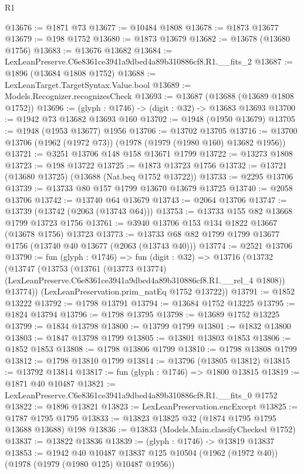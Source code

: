 \begin{lexlean}{R1}
\begin{coremodule}
@13676 := @1871 @73
@13677 := @10484 @1808
@13678 := @1873 @13677
@13679 := @198 @1752
@13680 := @1873 @13679
@13682 := @13678 (@13680 @1756)
@13683 := @13676 @13682
@13684 := LexLeanPreserve.C6e8361ce3941a9dbed4a89b310886cf8.R1.__fits_2
@13687 := @1896 (@13684 @1808 @1752)
@13688 := LexLeanTarget.TargetSyntax.Value.bool
@13689 := Models.Recognizer.recognizesCheck
@13693 := @13687 (@13688 (@13689 @1808 @1752))
@13696 := (glyph : @1746) -> (digit : @32) -> @13683 @13693
@13700 := @1942 @73 @13682 @13693 @160
@13702 := @1948 (@1950 @13679)
@13705 := @1948 (@1953 @13677) @1956
@13706 := @13702 @13705
@13716 := @13700 @13706 (@1962 (@1972 @73)) (@1978 (@1979 (@1980 @160) @13682 @1956))
@13721 := @3251 @13706 @148 @158 @13671 @1799
@13722 := @13273 @1808
@13723 := @198 @13722
@13725 := @1873 @13723 @1756
@13732 := @13721 (@13680 @13725) (@13688 (Nat.beq @1752 @13722))
@13733 := @2295 @13706
@13739 := @13733 @80 @157 @1799 @13670 @13679 @13725
@13740 := @2058 @13706
@13742 := @13740 @64 @13679
@13743 := @2064 @13706
@13747 := @13739 (@13742 (@2063 (@13743 @64)))
@13753 := @13733 @155 @82 @13668 @1799 @13723 @1756
@13761 := @3940 @13706 @153 @134 @1822 @13667 (@13678 @1756) @13723
@13773 := @13733 @68 @82 @1799 @1799 @13677 @1756 (@13740 @40 @13677 (@2063 (@13743 @40)))
@13774 := @2521 @13706
@13790 := fun (glyph : @1746) =>
  fun (digit : @32) =>
  @13716
    (@13732
      (@13747
        (@13753
          (@13761
            (@13773 @13774)
            (LexLeanPreserve.C6e8361ce3941a9dbed4a89b310886cf8.R1.__rel_4 @1808))
          @13774))
      (LexLeanPreservation.prim_natEq @1752 @13722))
@13791 := @1852 @13222
@13792 := @1798 @13791
@13794 := @13684 @1752 @13225
@13795 := @1824 @13794
@13796 := @1798 @13795
@13798 := @13689 @1752 @13225
@13799 := @1834 @13798
@13800 := @13799 @1799
@13801 := @1832 @13800
@13803 := @1847 @13798 @1799
@13805 := @13801 @13803 @1853
@13806 := @1852 @1853
@13808 := @1798 @13806 @1799
@13810 := @1798 @13808 @1799
@13812 := @1798 @13810 @1799
@13814 := @13796 (@13805 @13812)
@13815 := @13792 @13814
@13817 := fun (glyph : @1746) => @1800 @13815
@13819 := @1871 @40 @10487
@13821 := LexLeanPreserve.C6e8361ce3941a9dbed4a89b310886cf8.R1.__fits_0 @1752
@13822 := @1896 @13821
@13823 := LexLeanPreservation.encExcept
@13825 := @1787 @1795 @1795
@13833 := @13823 @13825 @32 (@1874 @1795 @1795 @13688 @13688) @198
@13836 := @13833 (Models.Main.classifyChecked @1752)
@13837 := @13822 @13836
@13839 := (glyph : @1746) -> @13819 @13837
@13853 := @1942
    @40
    @10487
    @13837
    @125
    @10504
    (@1962 (@1972 @40))
    (@1978 (@1979 (@1980 @125) @10487 @1956))

\end{coremodule}
\end{lexlean}

